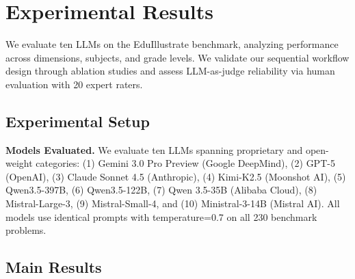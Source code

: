 \documentclass[11pt]{article}
\begin{document}
\section{Experimental Results}

We evaluate ten LLMs on the EduIllustrate benchmark, analyzing performance across dimensions, subjects, and grade levels. We validate our sequential workflow design through ablation studies and assess LLM-as-judge reliability via human evaluation with 20 expert raters.

\subsection{Experimental Setup}

\textbf{Models Evaluated.} We evaluate ten LLMs spanning proprietary and open-weight categories: (1) Gemini 3.0 Pro Preview (Google DeepMind), (2) GPT-5 (OpenAI), (3) Claude Sonnet 4.5 (Anthropic), (4) Kimi-K2.5 (Moonshot AI), (5) Qwen3.5-397B, (6) Qwen3.5-122B, (7) Qwen 3.5-35B (Alibaba Cloud), (8) Mistral-Large-3, (9) Mistral-Small-4, and (10) Ministral-3-14B (Mistral AI). All models use identical prompts with temperature=0.7 on all 230 benchmark problems.

\subsection{Main Results}
\end{document}
